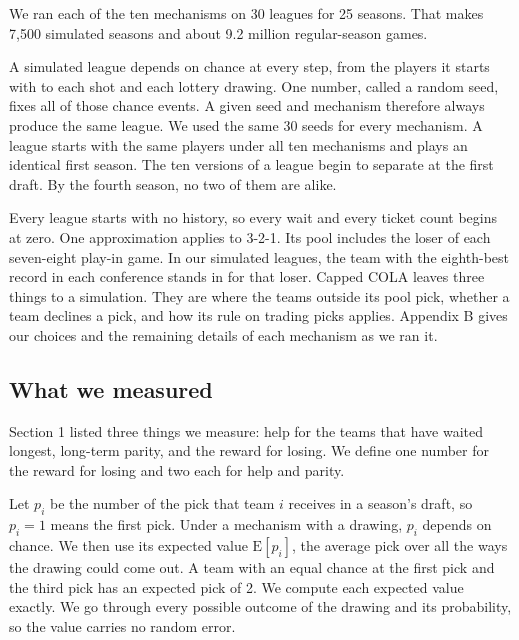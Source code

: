 \documentclass[11pt,letterpaper]{article}
\begin{document}
We ran each of the ten mechanisms on 30 leagues for 25 seasons. That makes 7,500 simulated seasons and about 9.2 million regular-season games.

A simulated league depends on chance at every step, from the players it starts with to each shot and each lottery drawing. One number, called a random seed, fixes all of those chance events. A given seed and mechanism therefore always produce the same league. We used the same 30 seeds for every mechanism. A league starts with the same players under all ten mechanisms and plays an identical first season. The ten versions of a league begin to separate at the first draft. By the fourth season, no two of them are alike.

Every league starts with no history, so every wait and every ticket count begins at zero. One approximation applies to 3-2-1. Its pool includes the loser of each seven-eight play-in game. In our simulated leagues, the team with the eighth-best record in each conference stands in for that loser. Capped COLA leaves three things to a simulation. They are where the teams outside its pool pick, whether a team declines a pick, and how its rule on trading picks applies. Appendix B gives our choices and the remaining details of each mechanism as we ran it.

\subsection{What we measured}

Section 1 listed three things we measure: help for the teams that have waited longest, long-term parity, and the reward for losing. We define one number for the reward for losing and two each for help and parity.

Let $p_i$ be the number of the pick that team $i$ receives in a season's draft, so $p_i = 1$ means the first pick. Under a mechanism with a drawing, $p_i$ depends on chance. We then use its expected value $\mathrm{E}[p_i]$, the average pick over all the ways the drawing could come out. A team with an equal chance at the first pick and the third pick has an expected pick of 2. We compute each expected value exactly. We go through every possible outcome of the drawing and its probability, so the value carries no random error.
\end{document}
